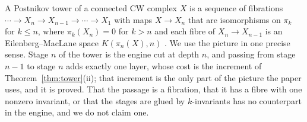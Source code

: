 \begin{remark}\label{rem:postnikov}
A Postnikov tower of a connected CW complex $X$ is a sequence of fibrations $\cdots\to X_{n}\to X_{n-1}\to\cdots\to X_{1}$ with maps $X\to X_{n}$ that are isomorphisms on $\pi_{k}$ for $k\le n$, where $\pi_{k}(X_{n})=0$ for $k>n$ and each fibre of $X_{n}\to X_{n-1}$ is an Eilenberg--MacLane space $K(\pi_{n}(X),n)$ \cite[Section~4.3]{Hat02}. We use the picture in one precise sense. Stage $n$ of the tower is the engine cut at depth $n$, and passing from stage $n-1$ to stage $n$ adds exactly one layer, whose cost is the increment of Theorem~\ref{thm:tower}(ii); that increment is the only part of the picture the paper uses, and it is proved. That the passage is a fibration, that it has a fibre with one nonzero invariant, or that the stages are glued by $k$-invariants has no counterpart in the engine, and we do not claim one.
\end{remark}
